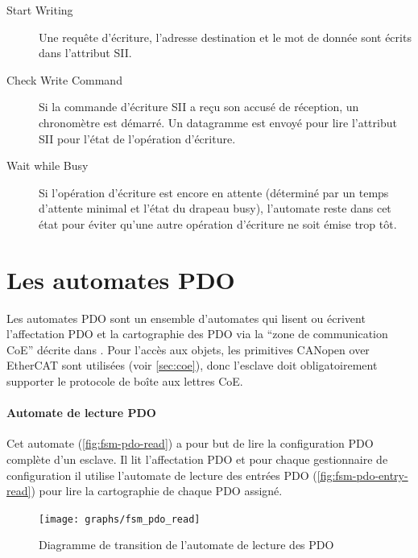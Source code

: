 \documentclass[a4paper,12pt,BCOR6mm,bibtotoc,idxtotoc]{scrbook}
\begin{document}
\begin{description}

\item[Start Writing] Une requ\^ete d'\'ecriture, l'adresse destination
  et le mot de donn\'ee sont \'ecrits dans l'attribut SII.

\item[Check Write Command] Si la commande d'\'ecriture SII a re\c{c}u
  son accus\'e de r\'eception, un chronom\`etre est d\'emarr\'e.  Un
  datagramme est envoy\'e pour lire l'attribut SII pour l'\'etat de
  l'op\'eration d'\'ecriture.

\item[Wait while Busy] Si l'op\'eration d'\'ecriture est encore en
  attente (d\'etermin\'e par un temps d'attente minimal et l'\'etat du
  drapeau busy), l'automate reste dans cet \'etat pour \'eviter qu'une
  autre op\'eration d'\'ecriture ne soit \'emise trop t\^ot.

\end{description}


\section{Les automates PDO}
\label{sec:fsm-pdo}

Les automates PDO sont un ensemble d'automates qui lisent ou
\'ecrivent l'affectation PDO et la cartographie des PDO via la ``zone
de communication CoE'' d\'ecrite dans \cite[sec. 5.6.7.4]{alspec}.
Pour l'acc\`es aux objets, les primitives CANopen over EtherCAT sont
utilis\'ees (voir \autoref{sec:coe}), donc l'esclave doit
obligatoirement supporter le protocole de bo\^ite aux lettres CoE.

\paragraph{Automate de lecture PDO} Cet automate
(\autoref{fig:fsm-pdo-read}) a pour but de lire la configuration PDO
compl\`ete d'un esclave.  Il lit l'affectation PDO et pour chaque
gestionnaire de configuration il utilise l'automate de lecture des
entr\'ees PDO (\autoref{fig:fsm-pdo-entry-read}) pour lire la
cartographie de chaque PDO assign\'e.


\begin{figure}[htbp]
  \centering
  \texttt{[image: graphs/fsm\_pdo\_read]}
  \caption{Diagramme de transition de l'automate de lecture des PDO}
  \label{fig:fsm-pdo-read}
\end{figure}
\end{document}
